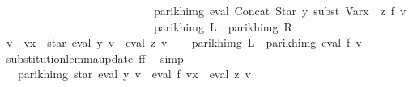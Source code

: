 \begin{isabellebody}
\ \ \ \ \ \ \ \ \ \ \ \ \ \ \ \ \ \ \ \ \ \ \ \ \ \ {\isasymsubseteq}\ parikh{\isacharunderscore}{\kern0pt}img\ {\isacharparenleft}{\kern0pt}eval\ {\isacharparenleft}{\kern0pt}Concat\ {\isacharparenleft}{\kern0pt}Star\ y{\isacharparenright}{\kern0pt}\ {\isacharparenleft}{\kern0pt}subst\ {\isacharparenleft}{\kern0pt}Var{\isacharparenleft}{\kern0pt}x\ {\isacharcolon}{\kern0pt}{\isacharequal}{\kern0pt}\ z{\isacharparenright}{\kern0pt}{\isacharparenright}{\kern0pt}\ f{\isacharparenright}{\kern0pt}{\isacharparenright}{\kern0pt}\ v{\isacharparenright}{\kern0pt}{\isachardoublequoteclose}\isanewline
\ \ \ \ \ \ \ \ \ \ \ \ \ \ \ \ \ \ \ \ \ \ \ \ \ \ {\isacharparenleft}{\kern0pt}\ {\isachardoublequoteopen}parikh{\isacharunderscore}{\kern0pt}img\ {\isacharquery}{\kern0pt}L\ {\isasymsubseteq}\ parikh{\isacharunderscore}{\kern0pt}img\ {\isacharquery}{\kern0pt}R{\isachardoublequoteclose}{\isacharparenright}{\kern0pt}\isanewline
%
\isadelimproof
%
\endisadelimproof
%
\isatagproof
{}\isamarkupfalse%
\ {\isacharminus}{\kern0pt}\isanewline
\ \ \isamarkupfalse%
\ {\isacharquery}{\kern0pt}v{\isacharprime}{\kern0pt}\ {\isacharequal}{\kern0pt}\ {\isachardoublequoteopen}v{\isacharparenleft}{\kern0pt}x\ {\isacharcolon}{\kern0pt}{\isacharequal}{\kern0pt}\ star\ {\isacharparenleft}{\kern0pt}eval\ y\ v{\isacharparenright}{\kern0pt}\ {\isacharat}{\kern0pt}{\isacharat}{\kern0pt}\ eval\ z\ v{\isacharparenright}{\kern0pt}{\isachardoublequoteclose}\isanewline
\ \ \isamarkupfalse%
\ {\isachardoublequoteopen}parikh{\isacharunderscore}{\kern0pt}img\ {\isacharquery}{\kern0pt}L\ {\isacharequal}{\kern0pt}\ parikh{\isacharunderscore}{\kern0pt}img\ {\isacharparenleft}{\kern0pt}eval\ f\ {\isacharquery}{\kern0pt}v{\isacharprime}{\kern0pt}{\isacharparenright}{\kern0pt}{\isachardoublequoteclose}\ \isamarkupfalse%
\ substitution{\isacharunderscore}{\kern0pt}lemma{\isacharunderscore}{\kern0pt}update{\isacharbrackleft}{\kern0pt}\ f{\isacharequal}{\kern0pt}f{\isacharbrackright}{\kern0pt}\ \isamarkupfalse%
\ simp\isanewline
\ \ \isamarkupfalse%
\ \isamarkupfalse%
\ {\isachardoublequoteopen}{\isasymdots}\ {\isasymsubseteq}\ parikh{\isacharunderscore}{\kern0pt}img\ {\isacharparenleft}{\kern0pt}star\ {\isacharparenleft}{\kern0pt}eval\ y\ v{\isacharparenright}{\kern0pt}\ {\isacharat}{\kern0pt}{\isacharat}{\kern0pt}\ eval\ f\ {\isacharparenleft}{\kern0pt}{\isacharquery}{\kern0pt}v{\isacharprime}{\kern0pt}{\isacharparenleft}{\kern0pt}x\ {\isacharcolon}{\kern0pt}{\isacharequal}{\kern0pt}\ eval\ z\ v{\isacharparenright}{\kern0pt}{\isacharparenright}{\kern0pt}{\isacharparenright}{\kern0pt}{\isachardoublequoteclose}\isanewline

\end{isabellebody}

